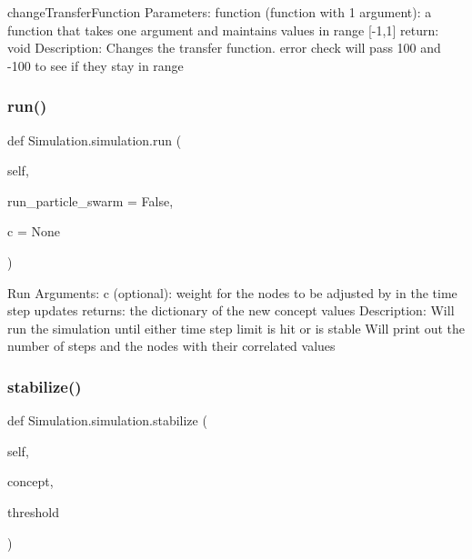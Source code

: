 \begin{DoxyVerb}changeTransferFunction
Parameters: function (function with 1 argument): a function that takes one argument and maintains values in range [-1,1]
return: void
Description: Changes the transfer function. error check will pass 100 and -100  to see if they stay in range
\end{DoxyVerb}
 \hypertarget{class_simulation_1_1simulation_a2f32f5da01e7f1485510f5982be2860c}{}\label{class_simulation_1_1simulation_a2f32f5da01e7f1485510f5982be2860c} 
\subsubsection{\texorpdfstring{run()}{run()}}
{\footnotesize\ttfamily def Simulation.\+simulation.\+run (\begin{DoxyParamCaption}\item[{}]{self,  }\item[{}]{run\+\_\+particle\+\_\+swarm = {\ttfamily False},  }\item[{}]{c = {\ttfamily None} }\end{DoxyParamCaption})}

\begin{DoxyVerb}Run
Arguments: c (optional): weight for the nodes to be adjusted by in the time step updates
returns: the dictionary of the new concept values
Description: Will run the simulation until either time step limit is hit or is stable
Will print out the number of steps and the nodes with their correlated values
\end{DoxyVerb}
 \hypertarget{class_simulation_1_1simulation_aba88676dbf04c07845b65cae2c85e536}{}\label{class_simulation_1_1simulation_aba88676dbf04c07845b65cae2c85e536} 
\subsubsection{\texorpdfstring{stabilize()}{stabilize()}}
{\footnotesize\ttfamily def Simulation.\+simulation.\+stabilize (\begin{DoxyParamCaption}\item[{}]{self,  }\item[{}]{concept,  }\item[{}]{threshold }\end{DoxyParamCaption})}

